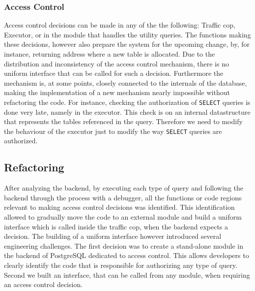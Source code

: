 \subsubsection{Access Control}
%
Access control decisions can be made in any of the the following: Traffic cop, Executor, or in the module that handles the utility queries.
%
The functions making these decisions, however also prepare the system for the upcoming change, by, for instance, returning address where a new table is allocated.
%
Due to the distribution and inconsistency of the access control mechanism, there is no uniform interface that can be called for such a decision.
%
Furthermore  the mechanism is, at some points, closely connected to the internals of the database, making the implementation of a new mechanism nearly impossible without refactoring the code.
%
For instance, checking the authorization of \texttt{SELECT} queries is done very late, namely in the executor.
%
This check is on an internal datastructure that represents the tables referenced in the query.
%
Therefore we need to modify the behaviour of the executor just to modify the way \texttt{SELECT} queries are authorized.

%
\FloatBarrier

%
\subsection{Refactoring}
%
After analyzing the backend, by executing each type of query and following the backend through the process with a debugger, all the functions or code regions relevant to making access control decisions was identified.
%
This identification allowed to gradually move the code to an external module and build a uniform interface which is called inside the traffic cop, when the backend expects a decision. 
%
The building of a uniform interface however introduced several engineering challenges.
%
The first decision was to create a stand-alone module in the backend of PostgreSQL dedicated to access control.
This allows developers to clearly identify the code that is responsible for authorizing any type of query.
%
Second we built an interface, that can be called from any module, when requiring an access control decision.


